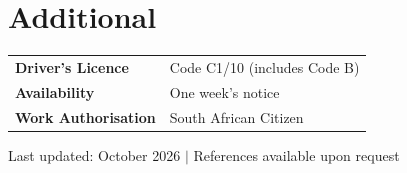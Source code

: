 \documentclass[a4paper,10.5pt]{article}
\begin{document}
\section{Additional}

\vspace{5pt}
\begin{tabularx}{\linewidth}{@{}l X@{}}
  \textbf{Driver's Licence}   & Code C1/10 (includes Code B) \\[2pt]
  \textbf{Availability}       & One week’s notice \\[2pt]
  \textbf{Work Authorisation} & South African Citizen \\
\end{tabularx}

\vfill
{\centering\footnotesize\color{gray} Last updated: October 2026 \quad $|$ \quad References available upon request\par}
\end{document}
